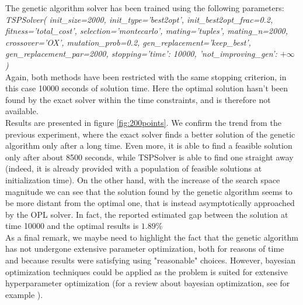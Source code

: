 \documentclass{article}
\begin{document}
The genetic algorithm solver has been trained using the following parameters: \\
\newline
\textit{TSPSolver(
    init\_size=2000, init\_type='best2opt', init\_best2opt\_frac=0.2, fitness='total\_cost',
    selection='montecarlo', mating='tuples', mating\_n=2000, crossover='OX', mutation\_prob=0.2,
    gen\_replacement='keep\_best', gen\_replacement\_par=2000,
    stopping={'time': 10000, 'not\_improving\_gen': $+\infty$}
)} \\
\newline
Again, both methods have been restricted with the same stopping criterion, in this case 10000 seconds of solution time. Here the optimal solution hasn't been found by the exact solver within the time constraints, and is therefore not available. \\
Results are presented in figure \ref{fig:200points}. We confirm the trend from the previous experiment, where the exact solver finds a better solution of the genetic algorithm only after a long time. Even more, it is able to find a feasible solution only after about 8500 seconds, while TSPSolver is able to find one straight away (indeed, it is already provided with a population of feasible solutions at initialization time). On the other hand, with the increase of the search space magnitude we can see that the solution found by the genetic algorithm seems to be more distant from the optimal one, that is instead asymptotically approached by the OPL solver. In fact, the reported estimated gap between the solution at time 10000 and the optimal results is $1.89\%$ \\
\newline
As a final remark, we maybe need to highlight the fact that the genetic algorithm has not undergone extensive parameter optimization, both for reasons of time and because results were satisfying using "reasonable" choices. However, bayesian optimization techniques could be applied as the problem is suited for extensive hyperparameter optimization (for a review about bayesian optimization, see for example \cite{shahriari2015taking}).







\end{document}
